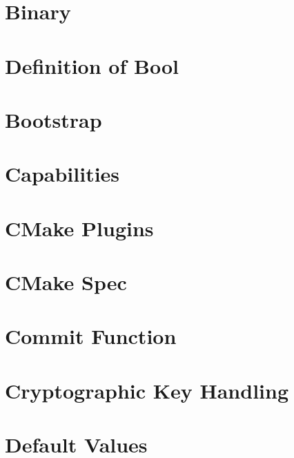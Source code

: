 \let\mypdfximage\pdfximage\def\pdfximage{\immediate\mypdfximage}\documentclass[twoside]{book}
\newcommand{\+}{\discretionary{\mbox{\scriptsize$\hookleftarrow$}}{}{}}
\begin{document}
\chapter{Binary}
\label{doc_decisions_binary_md}

\chapter{Definition of Bool}
\label{doc_decisions_boolean_md}

\chapter{Bootstrap}
\label{doc_decisions_bootstrap_md}

\chapter{Capabilities}
\label{doc_decisions_capabilities_md}

\chapter{CMake Plugins}
\label{doc_decisions_cmake_plugins_md}

\chapter{CMake Spec}
\label{doc_decisions_cmake_spec_md}

\chapter{Commit Function}
\label{doc_decisions_commit_function_md}

\chapter{Cryptographic Key Handling}
\label{doc_decisions_cryptograhic_key_handling_md}

\chapter{Default Values}
\label{doc_decisions_default_values_md}

\end{document}
